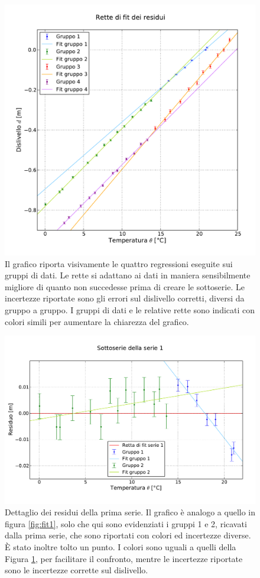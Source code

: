\begin{figure}
    \centering
    \includegraphics[width=120mm]{immagini/residui.pdf}
    \caption{Il grafico riporta visivamente le quattro regressioni eseguite sui gruppi di dati.
    Le rette si adattano ai dati in maniera sensibilmente migliore di quanto non succedesse prima
    di creare le sottoserie. Le incertezze riportate sono gli errori sul dislivello corretti, diversi
    da gruppo a gruppo. I gruppi di dati e le relative rette sono indicati con colori simili per
    aumentare la chiarezza del grafico.}
    \label{fig:residui}
\end{figure}

\begin{figure}[p]
    \centering
    \includegraphics[width=130mm]{immagini/fit1r.pdf}
    \caption{Dettaglio dei residui della prima serie. Il grafico è analogo a quello in figura \ref{fig:fit1},
    solo che qui sono evidenziati i gruppi 1 e 2, ricavati dalla prima serie, che sono
    riportati con colori ed incertezze diverse. È stato inoltre tolto un punto.
    I colori sono uguali a quelli della Figura \ref{fig:residui},
    per facilitare il confronto, mentre le incertezze riportate sono le incertezze corrette sul dislivello.}
    \label{fig:fit1r}
\end{figure}

